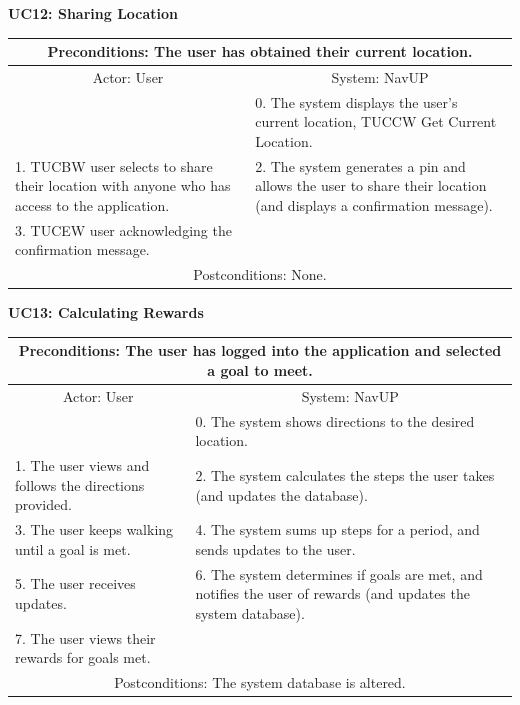 \documentclass{article}
\begin{document}
				\vspace{5mm}
                \begin{flushleft}
                \textbf{UC12: Sharing Location}\\
                \end{flushleft}
        		\centering		
       		 \small
       		 \begin{tabular}{|p{8cm}|p{8cm}|}
       		 \hline
       		\multicolumn{2}{c}{ Preconditions: The user has obtained their current location.} \\
       		 \hline
       		 \multicolumn{1}{c}{Actor: User} & \multicolumn{1}{c}{ System: NavUP} \\
        		\hline
       		  & 0.	The system displays the user's current location, TUCCW Get Current Location.\\
       		 \hline
       		 1.	TUCBW user selects to share their location with anyone who has access to the application. & 2.	The system generates a pin and allows the user to share their location (and displays a confirmation message).\\
        		\hline
       		3.	TUCEW user acknowledging the confirmation message. &\\
       		 \hline
        		\multicolumn{2}{c}{Postconditions: None.} \\
        		\hline
        \end{tabular} 
       

				\vspace{5mm}
                \begin{flushleft}
				\textbf{UC13: Calculating Rewards}\\
				\end{flushleft}
        		\centering	
       		 \small
       		 \begin{tabular}{|p{8cm}|p{8cm}|}
       		 \hline
       		 \multicolumn{2}{c}{Preconditions: The user has logged into the application and selected a goal to meet.} \\
       		 \hline
       		 \multicolumn{1}{c}{Actor: User} & \multicolumn{1}{c}{ System: NavUP} \\
        		\hline
       		 & 0.	The system shows directions to the desired location.\\
       		 \hline
       		 1.	The user views and follows the directions provided. & 2.	The system calculates the steps the user takes (and updates the database).\\
        		\hline
       		 3.	The user keeps walking until a goal is met. & 4.	The system sums up steps for a period, and sends updates to the user.\\
        		\hline
       		 5.	The user receives updates. & 6.	The system determines if goals are met, and notifies the user of rewards (and updates the system database).\\
        		\hline
        		7.	The user views their rewards for goals met. & \\
       		 \hline
        		\multicolumn{2}{c}{Postconditions: The system database is altered. } \\
        		\hline
        \end{tabular} 
        
\end{document}
